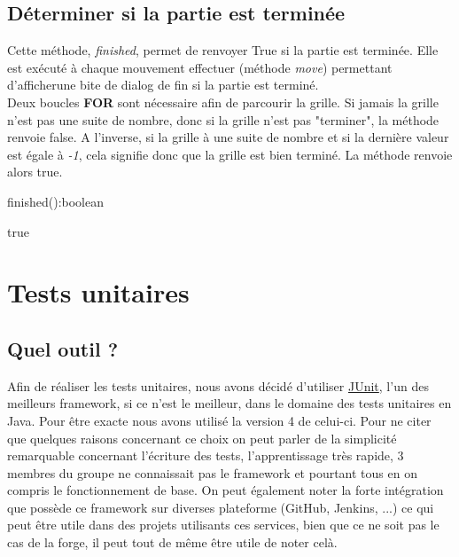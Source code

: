 		\subsection{Déterminer si la partie est terminée}

			Cette méthode, \textit{finished}, permet de renvoyer True si la partie est terminée. Elle est exécuté à chaque mouvement effectuer (méthode \textit{move}) permettant d'afficherune bite de dialog de fin si la partie est terminé.\\
			Deux boucles \textbf{FOR} sont nécessaire afin de parcourir la grille. Si jamais la grille n'est pas une suite de nombre, donc si la grille n'est pas "terminer", la méthode renvoie false. A l'inverse, si la grille à une suite de nombre et si la dernière valeur est égale à \textit{-1}, cela signifie donc que la grille est bien terminé. La méthode renvoie alors true.

			\begin{algorithm}[H]
				\caption{finished():boolean}
				\Return true
			\end{algorithm}

	\section{Tests unitaires}
		\subsection{Quel outil ?}

			Afin de réaliser les tests unitaires, nous avons décidé d'utiliser \href{https://junit.org/junit4/}{JUnit}, l'un des meilleurs framework, si ce n'est le meilleur, dans le domaine des tests unitaires en Java. Pour être exacte nous avons utilisé la version 4 de celui-ci. Pour ne citer que quelques raisons concernant ce choix on peut parler de la simplicité remarquable concernant l'écriture des tests, l'apprentissage très rapide, 3 membres du groupe ne connaissait pas le framework et pourtant tous en on compris le fonctionnement de base. On peut également noter la forte intégration que possède ce framework sur diverses plateforme (GitHub, Jenkins, ...) ce qui peut être utile dans des projets utilisants ces services, bien que ce ne soit pas le cas de la forge, il peut tout de même être utile de noter celà.

